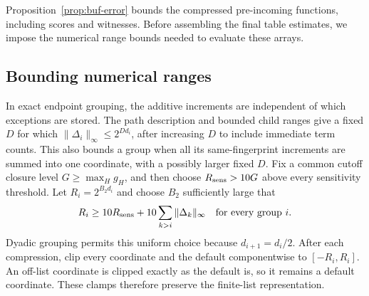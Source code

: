Proposition~\ref{prop:buf-error} bounds the compressed pre-incoming
functions, including scores and witnesses.  Before assembling the final
table estimates, we impose the numerical range bounds needed to evaluate
these arrays.

\subsection{Bounding numerical ranges}

In exact endpoint grouping, the additive increments are independent of
which exceptions are stored.  The path description and bounded child
ranges give a fixed $D$ for which
$\|\Delta_i\|_\infty\leq2^{Dd_i}$, after increasing $D$ to include
immediate term counts.  This also bounds a group when all its same-fingerprint
increments are summed into one coordinate, with a possibly larger fixed
$D$.  Fix a common cutoff closure level $G\ge\max_H g_H$, and then
choose $R_{\rm sens}>10G$ above every sensitivity threshold.  Let
$R_i=2^{B_2d_i}$ and choose $B_2$ sufficiently large that
\begin{equation}
 R_i\geq 10R_{\rm sens}+10\sum_{k>i}\|\Delta_k\|_\infty
 \quad\text{for every group }i.
 \label{eq:buf-clamp-margin}
\end{equation}
Dyadic grouping permits this uniform choice because $d_{i+1}=d_i/2$.
After each compression, clip every coordinate and the default
componentwise to $[-R_i,R_i]$.
An off-list coordinate is clipped exactly as the default is, so it
remains a default coordinate.  These clamps therefore preserve the
finite-list representation.

